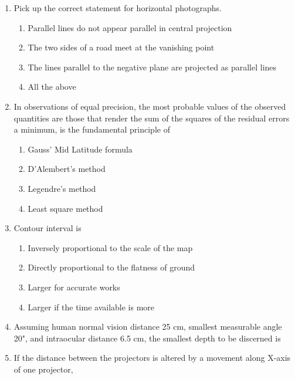 \documentclass[11pt,a4paper]{article}
\begin{document}
\begin{enumerate}
\item{Pick up the correct statement for horizontal photographs.}
\begin{enumerate}[label=\Alph*.]
\item{Parallel lines do not appear parallel in central projection}
\item{The two sides of a road meet at the vanishing point}
\item{The lines parallel to the negative plane are projected as parallel lines}
\item{All the above}
\end{enumerate}
\item{In observations of equal precision, the most probable values of the observed quantities are those that render the sum of the squares of the residual errors a minimum, is the fundamental principle of}
\begin{enumerate}[label=\Alph*.]
\item{Gauss' Mid Latitude formula}
\item{D'Alembert's method}
\item{Legendre's method}
\item{Least square method}
\end{enumerate}
\item{Contour interval is}
\begin{enumerate}[label=\Alph*.]
\item{Inversely proportional to the scale of the map}
\item{Directly proportional to the flatness of ground}
\item{Larger for accurate works}
\item{Larger if the time available is more}
\end{enumerate}
\item{Assuming human normal vision distance 25 cm, smallest measurable angle 20", and intraocular distance 6.5 cm, the smallest depth to be discerned is}
\\\begin{enumerate*}[itemjoin=\qquad, label=\Alph*.]
\item{0.1 mm}
\item{0.5 mm}
\item{1.00 mm}
\item{1.1 mm}
\end{enumerate*}
\item{If the distance between the projectors is altered by a movement along X-axis of one projector,}
\begin{enumerate}[label=\Alph*.]

\end{enumerate}
\end{enumerate}
\end{document}
